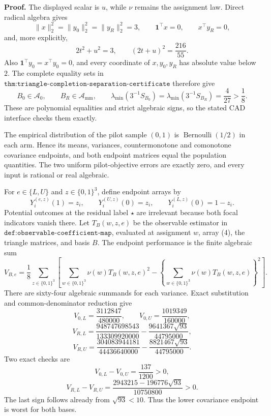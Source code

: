 \textbf{Proof.}
The displayed scalar is \(u\), while \(\nu\) remains the assignment law.  Direct radical algebra gives
\[
\lVert x\rVert_2^2=\lVert y_0\rVert_2^2=\lVert y_R\rVert_2^2=3,
\qquad
\mathbf1^{\top}x=0,
\qquad
x^{\top}y_R=0,
\tag{1}
\]
and, more explicitly,
\[
2t^2+u^2=3,
\qquad
(2t+u)^2=\frac{216}{55}.
\tag{2}
\]
Also \(\mathbf1^{\top}y_0=x^{\top}y_0=0\), and every coordinate of \(x,y_0,y_R\) has absolute value below \(2\).  The complete equality sets in \(\texttt{thm:triangle-completion-separation-certificate}\) therefore give
\[
B_0\in\mathcal A_0,
\qquad
B_R\in\mathcal A_{\mathrm{mm}},
\qquad
\lambda_{\min}(3^{-1}S_{B_0})
=\lambda_{\min}(3^{-1}S_{B_R})=\frac4{27}>\frac18.
\tag{3}
\]
These are polynomial equalities and strict algebraic signs, so the stated CAD interface checks them exactly.

The empirical distribution of the pilot sample \((0,1)\) is \(\operatorname{Bernoulli}(1/2)\) in each arm.  Hence its means, variances, countermonotone and comonotone covariance endpoints, and both endpoint matrices equal the population quantities.  The two uniform pilot-objective errors are exactly zero, and every input is rational or real algebraic.

For \(e\in\{L,U\}\) and \(z\in\{0,1\}^3\), define endpoint arrays by
\[
Y_i^{(e,z)}(1)=z_i,
\qquad
Y_i^{(U,z)}(0)=z_i,
\qquad
Y_i^{(L,z)}(0)=1-z_i.
\tag{4}
\]
Potential outcomes at the residual label \(\star\) are irrelevant because both focal indicators vanish there.  Let \(T_B(w,z,e)\) be the observable estimator in \(\texttt{def:observable-coefficient-map}\), evaluated at assignment \(w\), array (4), the triangle matrices, and basis \(B\).  The endpoint performance is the finite algebraic sum
\[
V_{B,e}=\frac18\sum_{z\in\{0,1\}^3}
\left[
\sum_{w\in\{0,1\}^3}\nu(w)T_B(w,z,e)^2
-\left\{\sum_{w\in\{0,1\}^3}\nu(w)T_B(w,z,e)\right\}^2
\right].
\tag{5}
\]
There are sixty-four algebraic summands for each variance.  Exact substitution and common-denominator reduction give
\[
V_{0,L}=\frac{3112847}{480000},
\qquad
V_{0,U}=\frac{1019349}{160000},
\tag{6}
\]
\[
V_{R,L}=\frac{948747698543}{133309920000}
-\frac{9641367\sqrt{93}}{44795000},
\tag{7}
\]
\[
V_{R,U}=\frac{304083944181}{44436640000}
-\frac{8821467\sqrt{93}}{44795000}.
\tag{8}
\]
Two exact checks are
\[
V_{0,L}-V_{0,U}=\frac{137}{1200}>0,
\tag{9}
\]
\[
V_{R,L}-V_{R,U}
=\frac{2943215-196776\sqrt{93}}{10750800}>0.
\tag{10}
\]
The last sign follows already from \(\sqrt{93}<10\).  Thus the lower covariance endpoint is worst for both bases.

